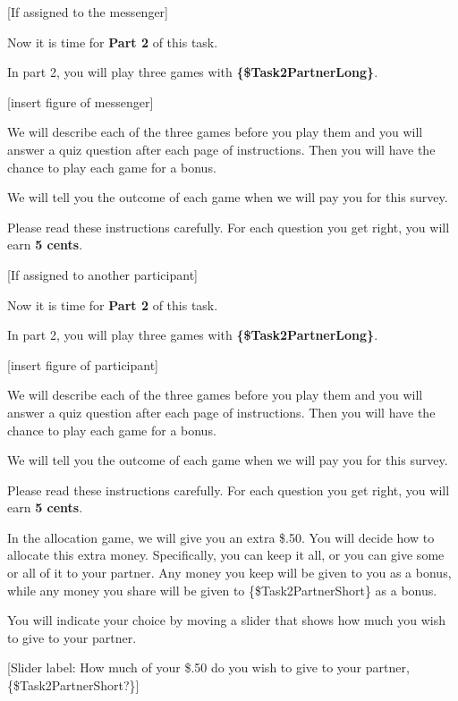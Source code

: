 [If assigned to the messenger]

Now it is time for \textbf{Part 2} of this task. 
    
    In part 2, you will play three
    games with \textbf{\{\$Task2PartnerLong\}}. 
    
    [insert figure of messenger]
    
    We will describe each of the three games before you play them and you
    will answer a quiz question after each page of instructions. Then you will
    have the chance to play each game for a bonus.

    We will tell you the outcome of each game when we will pay you for this
    survey. 
    
    Please read these instructions carefully. For each question you get
    right, you will earn \textbf{5 cents}.

    [If assigned to another participant]

    Now it is time for \textbf{Part 2} of this task. 
        
        In part 2, you will play three
        games with \textbf{\{\$Task2PartnerLong\}}. 
        
        [insert figure of participant]
        
        We will describe each of the three games before you play them and you
        will answer a quiz question after each page of instructions. Then you will
        have the chance to play each game for a bonus.
    
        We will tell you the outcome of each game when we will pay you for this
        survey. 
        
        Please read these instructions carefully. For each question you get
        right, you will earn \textbf{5 cents}.

\begin{description}[listparindent = 1.5em]
    \item[Allocation game:]  \hspace{1cm}
    
    In the allocation game, we will give you an extra \$.50. You will decide
    how to allocate this extra money. Specifically, you can keep it all, or you
    can give some or all of it to your partner. Any money you keep will be given
    to you as a bonus, while any money you share will be given to
    \{\$Task2PartnerShort\} as a bonus. 
    
    You will indicate your choice by moving a
    slider that shows how much you wish to give to your partner. 
    
    [Slider label:
    How much of your \$.50 do you wish to give to your partner,
    \{\$Task2PartnerShort?\}]
\end{description}

